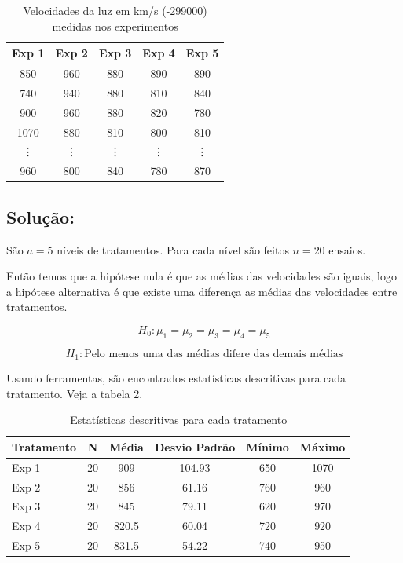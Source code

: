 \documentclass[12pt]{article}
\begin{document}
\begin{table}[ht]
\centering
\begin{tabular}{c c c c c}
\hline
Exp 1 & Exp 2 & Exp 3 & Exp 4 & Exp 5\\
\hline
850 & 960 & 880 & 890 & 890\\
740 & 940 & 880 & 810 & 840\\
900 & 960 & 880 & 820 & 780\\
1070 & 880 & 810  & 800 & 810\\
\vdots & \vdots & \vdots & \vdots & \vdots \\
960 & 800 & 840  & 780 & 870\\
\hline
\end{tabular}
\caption{Velocidades da luz em km/s (-299000) medidas nos experimentos }
\end{table}

\subsection*{Solução:}

São $a = 5 $ níveis de tratamentos. Para cada nível são feitos $n = 20$ ensaios.

Então temos que a hipótese nula é que as médias das velocidades são iguais, 
logo a hipótese alternativa é que existe uma diferença as médias das velocidades entre tratamentos.

\[
H_0: \mu_1 = \mu_2 = \mu_3 = \mu_4 = \mu_5
\]

\[
H_1: \text{Pelo menos uma das médias difere das demais médias}
\]

Usando ferramentas, são encontrados estatísticas descritivas para cada tratamento.
Veja a tabela 2.

\begin{table}[ht]
\centering
\begin{tabular}{lccccc}
\toprule
Tratamento & N & Média & Desvio Padrão & Mínimo & Máximo \\
\midrule
Exp 1 & 20 & 909 & 104.93 & 650 & 1070 \\
Exp 2 & 20 & 856 & 61.16 & 760 & 960 \\
Exp 3 & 20 & 845 & 79.11 & 620 & 970 \\
Exp 4 & 20 & 820.5 & 60.04 & 720 & 920 \\
Exp 5 & 20 & 831.5 & 54.22 & 740 & 950 \\
\bottomrule
\end{tabular}
\caption{Estatísticas descritivas para cada tratamento}
\end{table}
\end{document}
